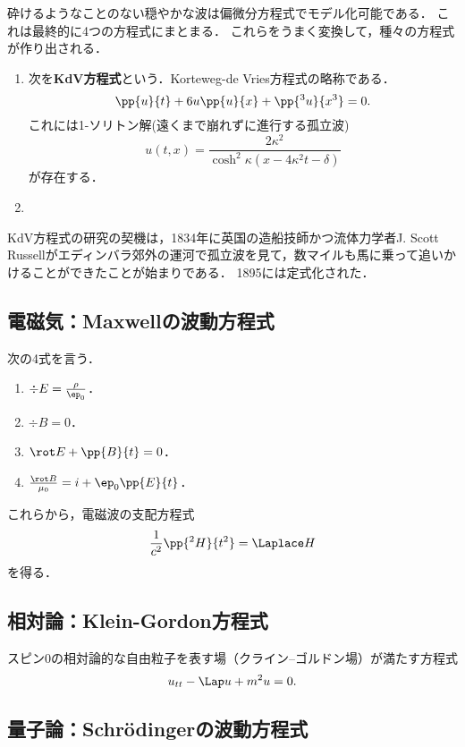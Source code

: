 \documentclass[uplatex,dvipdfmx]{jsreport}
\begin{document}
\begin{model}
    砕けるようなことのない穏やかな波は偏微分方程式でモデル化可能である．
    これは最終的に4つの方程式にまとまる．
    これらをうまく変換して，種々の方程式が作り出される．
    \begin{enumerate}
        \item 次を\textbf{KdV方程式}という．Korteweg-de Vries方程式の略称である．
        \[\pp{u}{t}+6u\pp{u}{x}+\pp{^3u}{x^3}=0.\]
        これには1-ソリトン解(遠くまで崩れずに進行する孤立波)
        \[u(t,x)=\frac{2\kappa^2}{\cosh^2\kappa(x-4\kappa^2t-\delta)}\]
        が存在する．
        \item 
    \end{enumerate}
\end{model}
\begin{history}
    KdV方程式の研究の契機は，1834年に英国の造船技師かつ流体力学者J. Scott Russellがエディンバラ郊外の運河で孤立波を見て，数マイルも馬に乗って追いかけることができたことが始まりである．
    1895には定式化された．
\end{history}

\subsection{電磁気：Maxwellの波動方程式}

\begin{model}
    次の4式を言う．
    \begin{enumerate}
        \item $\div E=\frac{\rho}{\ep_0}$．
        \item $\div B=0$．
        \item $\rot E+\pp{B}{t}=0$．
        \item $\frac{\rot B}{\mu_0}=i+\ep_0\pp{E}{t}$．
    \end{enumerate}
    これらから，電磁波の支配方程式
    \[\frac{1}{c^2}\pp{^2H}{t^2}=\Laplace H\]
    を得る．
\end{model}

\subsection{相対論：Klein-Gordon方程式}

\begin{model}
    スピン0の相対論的な自由粒子を表す場（クライン–ゴルドン場）が満たす方程式
    \[u_{tt}-\Lap u+m^2u=0.\]
\end{model}

\subsection{量子論：Schrödingerの波動方程式}
\end{document}
